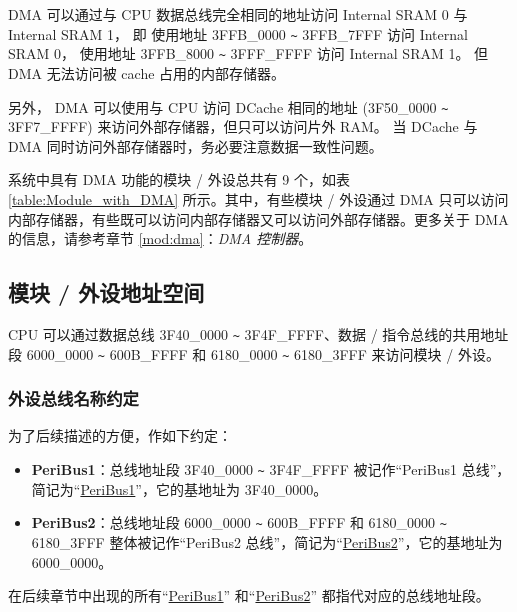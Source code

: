 \documentclass[main\_\_CN.tex]{subfiles}
\begin{document}
DMA 可以通过与 CPU 数据总线完全相同的地址访问 Internal SRAM 0 与 Internal SRAM 1，
即 使用地址 \hexprefix{}3FFB\_0000 \verb+~+ \hexprefix{}3FFB\_7FFF 访问 Internal SRAM 0，
使用地址 \hexprefix{}3FFB\_8000 \verb+~+ \hexprefix{}3FFF\_FFFF 访问 Internal SRAM 1。
但  DMA 无法访问被 cache 占用的内部存储器。

另外， DMA 可以使用与 CPU 访问 DCache 相同的地址 (\hexprefix{}3F50\_0000 \verb+~+ \hexprefix{}3FF7\_FFFF) 来访问外部存储器，但只可以访问片外 RAM。 当 DCache 与 DMA 同时访问外部存储器时，务必要注意数据一致性问题。

系统中具有 DMA 功能的模块 / 外设总共有 9 个，如表 \ref{table:Module_with_DMA} 所示。其中，有些模块 / 外设通过 DMA 只可以访问内部存储器，有些既可以访问内部存储器又可以访问外部存储器。更多关于 DMA 的信息，请参考章节 \ref{mod:dma}：\textit{DMA 控制器}。





\subsection{模块 / 外设地址空间}

CPU 可以通过数据总线 \hexprefix{}3F40\_0000 \verb+~+ \hexprefix{}3F4F\_FFFF、数据 / 指令总线的共用地址段 \hexprefix{}6000\_0000 \verb+~+ \hexprefix{}600B\_FFFF 和 \hexprefix{}6180\_0000 \verb+~+ \hexprefix{}6180\_3FFF 来访问模块 / 外设。

\subsubsection{外设总线名称约定} \label{Convention: Peripheral Bus Name}
为了后续描述的方便，作如下约定：
\begin{itemize}
    \item \textbf{PeriBus1}\label{PeripheralBus1}：总线地址段 \hexprefix{}3F40\_0000 \verb+~+ \hexprefix{}3F4F\_FFFF 被记作“PeriBus1 总线”，简记为“\hyperref[PeripheralBus1]{PeriBus1}”，它的基地址为 \hexprefix{}3F40\_0000。
    \item \textbf{PeriBus2}\label{PeripheralBus2}：总线地址段 \hexprefix{}6000\_0000 \verb+~+ \hexprefix{}600B\_FFFF 和 \hexprefix{}6180\_0000 \verb+~+ \hexprefix{}6180\_3FFF 整体被记作“PeriBus2 总线”，简记为“\hyperref[PeripheralBus2]{PeriBus2}”，它的基地址为 \hexprefix{}6000\_0000。
\end{itemize}
在后续章节中出现的所有“\hyperref[PeripheralBus1]{PeriBus1}” 和“\hyperref[PeripheralBus2]{PeriBus2}” 都指代对应的总线地址段。
\end{document}
